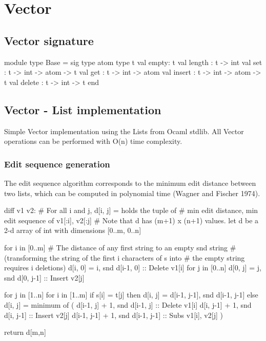 \documentclass{article}
\begin{document}
\newpage
\section{Vector}
\subsection{Vector signature}
\begin{longlisting}
module type Base = sig
  type atom
  type t
  val empty: t
  val length : t -> int
  val set : t -> int -> atom -> t
  val get : t -> int -> atom
  val insert : t -> int -> atom -> t
  val delete : t -> int -> t
end
\end{longlisting}

\subsection{Vector - List implementation}
Simple Vector implementation using the Lists from Ocaml stdlib. 
All Vector operations can be performed with O(n) time complexity.

\subsubsection{Edit sequence generation}
The edit sequence algorithm corresponds to the minimum edit distance between two lists, which can be computed in 
polynomial time (Wagner and Fischer 1974).

\begin{longlisting}[python]
diff v1 v2:
  # For all i and j, d[i, j] = holds the tuple of
  # min edit distance, min edit sequence of v1[:i], v2[:j]
  # Note that d has (m+1) x (n+1) values.
  let d be a 2-d array of int with dimensions [0..m, 0..n]
 
  for i in [0..m]
    # The distance of any first string to an empty snd string
    # (transforming the string of the first i characters of s into
    # the empty string requires i deletions)
    d[i, 0] = i, snd d[i-1, 0] :: Delete v1[i]
  for j in [0..n]
    d[0, j] = j, snd d[0, j-1] :: Insert v2[j]
 
  for j in [1..n]
    for i in [1..m]
      if s[i] = t[j] then  
        d[i, j] = d[i-1, j-1], snd d[i-1, j-1]
      else
        d[i, j] = minimum of
        (
          d[i-1, j] + 1, snd d[i-1, j] :: Delete v1[i]
          d[i, j-1] + 1, snd d[i, j-1] :: Insert v2[j]
          d[i-1, j-1] + 1, snd d[i-1, j-1] :: Subs v1[i], v2[j]
        )
 
  return d[m,n]
\end{longlisting}
\end{document}
